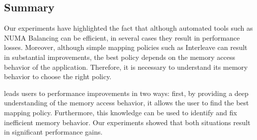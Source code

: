 \subsection{Summary}

Our experiments have highlighted the fact that although automated tools such
as NUMA Balancing can be efficient, in several cases they result in
performance losses. Moreover, although simple mapping policies such as Interleave
can result in substantial improvements, the best policy depends on the memory access behavior of the application. Therefore, it is necessary to understand its memory behavior to
choose the right policy.

\TABARNAC leads users to performance improvements in two ways: first, by
providing a deep understanding of the memory access behavior, it allows the user to
find the best mapping policy. Furthermore, this knowledge can be used to
identify and fix inefficient memory behavior. Our experiments showed that both
situations result in significant performance gains.
